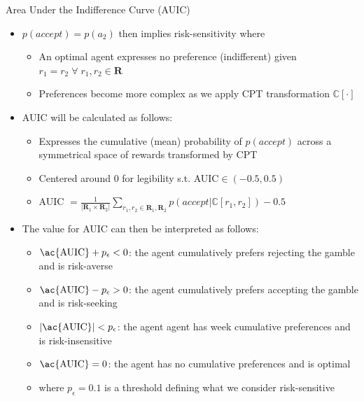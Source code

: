 \documentclass[aspectratio=1610, xcolor=dvipsnames]{packages/beamer}
\begin{document}
\begin{frame}{Area Under the Indifference Curve (AUIC)}
        \begin{itemize}
        \item $p(accept)=p(a_2)$ then implies risk-sensitivity where
            \begin{itemize}
                 \item An optimal agent expresses no preference (indifferent) given $r_1=r_2 \;\forall\; r_1,r_2 \in \mathbf{R}$
                 \item Preferences become more complex as we apply CPT transformation $\mathbb{C}[\cdot]$
            \end{itemize}


            \item \ac{AUIC} will be calculated as follows:
            \begin{itemize}
                 \item Expresses the cumulative (mean) probability of $p(accept)$ across a symmetrical space of rewards transformed by CPT
                \item Centered around $0$ for legibility s.t. AUIC$\in (-0.5,0.5)$
                \item \ac{AUIC} $=\frac{1}{|\mathbf{R}_1 \times \mathbf{R}_2|} \sum_{r_1,r_2\in \mathbf{R}_{1},\mathbf{R}_{2}}  p(accept | \mathbb{C}[r_1,r_2]) - 0.5$
            \end{itemize}
            \item The value for \ac{AUIC} can then be interpreted as follows:
            \begin{itemize}
                \item $\text{\ac{AUIC}}+p_{\epsilon} < 0$: the agent cumulatively prefers rejecting the gamble and is risk-averse
                \item $\text{\ac{AUIC}}-p_{\epsilon} > 0$: the agent cumulatively prefers accepting the gamble and is risk-seeking
                \item $|\text{\ac{AUIC}}| < p_{\epsilon}$: the agent agent has week cumulative preferences and is risk-insensitive
                \item $\text{\ac{AUIC}} = 0$: the agent has no cumulative preferences and is optimal
                \item where $p_{\epsilon}=0.1$ is a threshold defining what we consider risk-sensitive
            \end{itemize}


        \end{itemize}

\end{frame}
\end{document}
